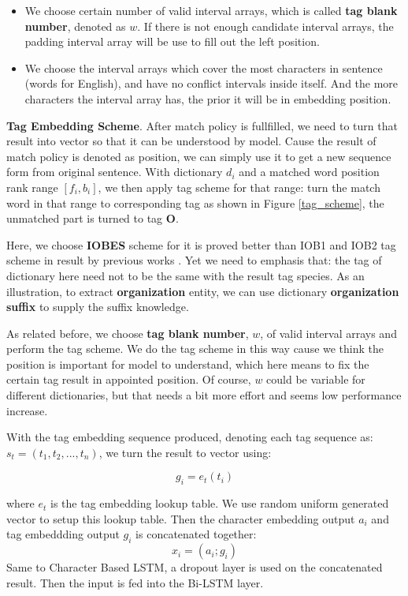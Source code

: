\documentclass[letterpaper]{article} %
\begin{document}
\begin{itemize}
\item We choose certain number of valid interval arrays, which is called \textbf{tag blank number}, denoted as $w$. If there is not enough candidate interval arrays, the padding interval array will be use to fill out the left position. 
\item We choose the interval arrays which cover the most characters in sentence (words for English), and have no conflict intervals inside itself. And the more characters the interval array has, the prior it will be in embedding position.
\end{itemize}



\textbf{Tag Embedding Scheme}. After match policy is fullfilled, we need to turn that result into vector so that it can be understood by model. Cause the result of match policy is denoted as position, we can simply use it to get a new sequence form from original sentence. With dictionary $d_i$ and a matched word position rank range $[f_i, b_i]$, we then apply tag scheme for that range: turn the match word in that range to corresponding tag as shown in Figure \ref{tag_scheme}, the unmatched part is turned to tag \textbf{O}.

Here, we choose \textbf{IOBES} scheme for it is proved better than IOB1 and IOB2 tag scheme in result by previous works \cite{char-fea1,mahovy}. Yet we need to emphasis that: the tag of dictionary here need not to be the same with the result tag species. As an illustration, to extract \textbf{organization} entity, we can use dictionary \textbf{organization suffix} to supply the suffix knowledge.

As related before, we choose \textbf{tag blank number}, $w$, of valid interval arrays and perform the tag scheme. We do the tag scheme in this way cause we think the position is important for model to understand, which here means to fix the certain tag result in appointed position. Of course, $w$ could be variable for different dictionaries, but that needs a bit more effort and seems low performance increase.

With the tag embedding sequence produced, denoting each tag sequence as: $s_t = (t_1, t_2, ..., t_n)$, we turn the result to vector using: 

\begin{equation}
g_i = e_t(t_i) \label{tag_embedding}
\end{equation}

where $e_t$ is the tag embedding lookup table. We use random uniform generated vector to setup this lookup table. Then the character embedding output $a_i$ and tag embeddding output $g_i$ is concatenated together:
\begin{equation}
x_i = (a_i;g_i) \label{concat}
\end{equation}
Same to Character Based LSTM, a dropout layer is used on the concatenated result. Then the input is fed into the Bi-LSTM layer.  
\end{document}
